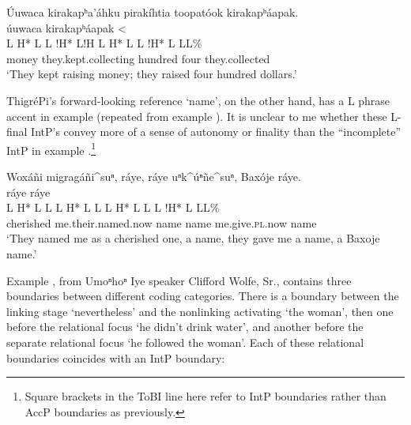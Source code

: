 \documentclass[output=paper]{LSP/langsci}
\begin{document}
\newpage
\ea\label{waterbusterincomplete}
 	Úuwaca kirakapʰa’áhku pirakíhtia toopatóok kirakapʰáapak.\rmfnm\\
\glll	úuwaca					{kirakapʰáapak <}\\
	{\ob L H* L}	{L !H* L!H\cb}	{\ob L H* L}		{}			{L !H* L L\cb{}L\%}\\
	money	they.kept.collecting			hundred		four			they.collected\\
\glt	`They kept raising money; they raised four hundred dollars.'
\z

ThigréPi’s forward-looking reference  `name', on the other hand, has a L phrase accent in example  (repeated from example ). It is unclear to me whether these L-final IntP’s convey more of a sense of autonomy or finality than the “incomplete” IntP in example .\footnote{Square brackets in the ToBI line here refer to IntP boundaries rather than AccP boundaries as previously.}

\ea\label{thigrepirayerept}
Woxáñi migragáñi\^{}suⁿ, ráye, ráye uⁿk\^{}úⁿñe\^{}suⁿ, Baxóje ráye.\rmfnm\\
\glll	{} 				ráye					ráye\\
	{\ob L H* L}		{L\cb}	{\ob L H* L L\cb}	{\ob L H* L}	{L\cb}	{\ob L !H* L} 		{L\cb{}L\%}\\
	cherished		me.their.named.now			name			name		me.give.\textsc{pl}.now						name\\
\glt	`They named me as a cherished one, a name, they gave me a name, a Baxoje name.'
\z

Example , from Umoⁿhoⁿ Iye speaker Clifford Wolfe, Sr., contains three boundaries between different coding categories. There is a boundary between the linking stage   `nevertheless' and the nonlinking activating   `the woman', then one before the relational focus  `he didn’t drink water', and another before the separate relational focus  `he followed the woman'. Each of these relational boundaries coincides with an IntP boundary:
\end{document}
